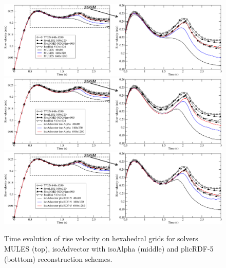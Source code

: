 \documentclass[review]{elsarticle}
\begin{document}
\begin{figure}[!h]
\begin{center}
 \vspace{-1mm}
 \includegraphics[width=\textwidth]{figures/HysingB_bubble_velocity_MULES.pdf}
 \includegraphics[width=\textwidth]{figures/HysingB_bubble_velocity_isoAlpha.pdf}
 \includegraphics[width=\textwidth]{figures/HysingB_bubble_velocity_plicRDF5.pdf}
 \vspace{-14mm}
\end{center}
\caption{Time evolution of rise velocity on hexahedral grids for solvers MULES (top), isoAdvector with isoAlpha (middle) and plicRDF-5 (botttom) reconstruction schemes.}
\label{fig:HB_Struct_bubble_velocity}
\end{figure}
\end{document}
